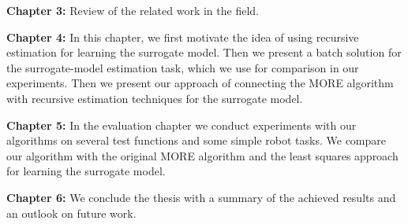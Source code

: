\textbf{Chapter 3:} Review of the related work in the field.

\textbf{Chapter 4:} In this chapter, we first motivate the idea of
using recursive estimation for learning the surrogate model.
Then we present a batch solution for the
surrogate-model estimation task, which we use for comparison
in our experiments.
Then we present our approach of connecting
the MORE algorithm with recursive estimation techniques for the 
surrogate model.

\textbf{Chapter 5:} In the evaluation chapter we conduct experiments
with our algorithms on several test functions and some simple robot tasks.
We compare our algorithm with the original MORE algorithm
and the least squares approach for learning the surrogate model.

\textbf{Chapter 6:} We conclude the thesis with a summary of
the achieved results and an outlook on future work.